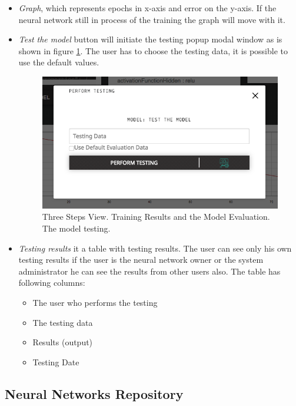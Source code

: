 \begin{itemize}
\item \emph{Graph}, which represents epochs in x-axis and error on the y-axis. If the neural network still in process of the training the graph will move with it. 
\item \emph{Test the model} button will initiate the testing popup modal window as is shown in figure \ref{fig:model_testing}. The user has to choose the testing data, it is possible to use the default values.

\begin{figure}[htbp]
\begin{center}
  \includegraphics[scale=0.5]{components/5/img/model_testing.png}
  \caption{Three Steps View. Training Results and the Model Evaluation. The model testing.}
  \label{fig:model_testing}
\end{center}
\end{figure}

\item \emph{Testing results} it a table with testing results. The user can see only his own testing results if the user is the neural network owner or the system administrator he can see the results from other users also. The table has following columns:
\begin{itemize}
\item The user who performs the testing 
\item The testing data
\item Results (output)
\item Testing Date
\end{itemize}


\end{itemize}





\subsection{Neural Networks Repository}\label{Neural Networks Repository}

